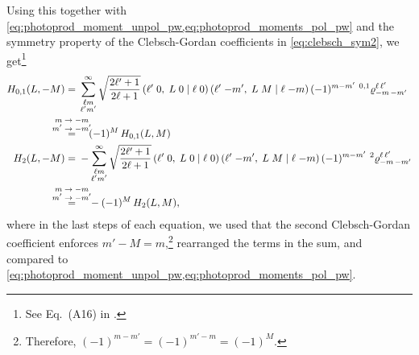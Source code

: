 Using this together with
\cref{eq:photoprod_moment_unpol_pw,eq:photoprod_moments_pol_pw} and the
symmetry property of the Clebsch-Gordan coefficients in
\cref{eq:clebsch_sym2}, we get\footnote{See Eq.~(A16) in
.}
\begin{align}
  H_{0, 1}(L, -M)
  ={}& \sum_{\substack{\ell m \\ \ell' m'}}^\infty
  \sqrt{\frac{2 \ell' + 1}{2 \ell + 1}}\,
  \clebsch{\ell'}{0}{L}{0}{\ell}{0}\, \clebsch{\ell'}{-m'}{L}{M}{\ell}{-m}\,
  (-1)^{m - m'}\, \prescript{0, 1}{}{\varrho}^{\ell\, \ell'}_{{-m}\, {-m}'} \notag
  \\
  \label{eq:photoprod_moments_01_sym_2}
  \equalUsing{$\mathclap{\substack{\displaystyle{m \to -m} \\ \displaystyle{m' \to -m'}}}$}{}& \quad
  (-1)^M\, H_{0, 1}(L, M)
  \\
  H_2(L, -M)
  ={}& -\sum_{\substack{\ell m \\ \ell' m'}}^\infty
  \sqrt{\frac{2 \ell' + 1}{2 \ell + 1}}\,
  \clebsch{\ell'}{0}{L}{0}{\ell}{0}\, \clebsch{\ell'}{-m'}{L}{M}{\ell}{-m}\,
  (-1)^{m - m'}\, \prescript{2}{}{\varrho}^{\ell\, \ell'}_{{-m}\, {-m}'} \notag
  \\
  \label{eq:photoprod_moment_2_sym_2}
  \equalUsing{$\mathclap{\substack{\displaystyle{m \to -m} \\ \displaystyle{m' \to -m'}}}$}{}& \quad
  -(-1)^M\, H_2(L, M),
\end{align}
where in the last steps of each equation, we used that the second Clebsch-Gordan
coefficient enforces $m' - M = m$,\footnote{Therefore, $(-1)^{m - m'}
= (-1)^{m' - m} = (-1)^M$.} rearranged the terms in the sum, and
compared to \cref{eq:photoprod_moment_unpol_pw,eq:photoprod_moments_pol_pw}.

